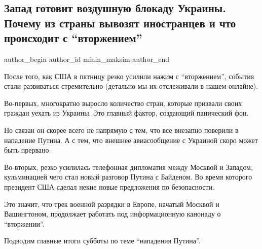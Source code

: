  
 
 
 
 
 
\subsection{Запад готовит воздушную блокаду Украины. Почему из страны вывозят иностранцев и что происходит с \enquote{вторжением}}
\label{sec:13_02_2022.stz.news.ua.strana.1.vozduh_blokada}
 
\ifcmt
 author_begin
   author_id minin_maksim
 author_end
\fi

После того, как США в пятницу резко усилили нажим с \enquote{вторжением}, события стали
развиваться стремительно (детально мы их отслеживали в нашем онлайне).

Во-первых, многократно выросло количество стран, которые призвали своих граждан
уехать из Украины. Это главный фактор, создающий панический фон. 


Но связан он скорее всего не напрямую с тем, что все внезапно поверили в
нападение Путина. А с тем, что внешнее авиасообщение с Украиной скоро может
быть прервано. 

Во-вторых, резко усилилась телефонная дипломатия между Москвой и Западом,
кульминацией чего стал новый разговор Путина с Байденом. Во время которого
президент США сделал некие новые предложения по безопасности.

Это значит, что трек военной разрядки в Европе, начатый Москвой и Вашингтоном,
продолжает работать под информационную канонаду о \enquote{вторжении}. 

Подводим главные итоги субботы по теме \enquote{нападения Путина}.


